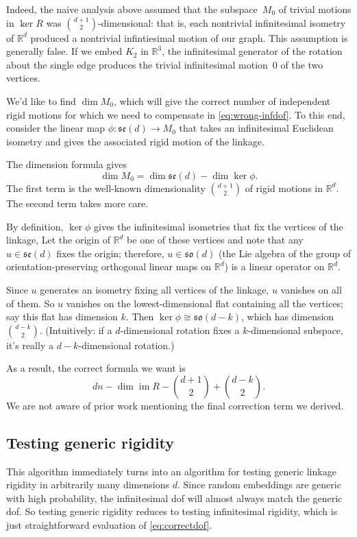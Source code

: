 \documentclass[aps,prd,final,twocolumn,letterpaper,nofootinbib]{revtex4-1}
\newcommand\RR{\mathbb{R}}
\DeclareMathOperator\im{im}
\begin{document}
Indeed, the naive analysis above
assumed that the subspace~$M_0$ of trivial motions in $\ker R$
was $\binom{d+1}{2}$-dimensional:
that is, each nontrivial infinitesimal isometry of $\RR^d$
produced a nontrivial infintiesimal motion of our graph.
This assumption is generally false.
If we embed $K_2$ in $\RR^3$,
the infinitesimal generator
of the rotation about the single edge
produces the trivial infinitesimal motion~0
of the two vertices.

We'd like to find $\dim M_0$,
which will give the correct number of independent rigid motions
for which we need to compensate in \cref{eq:wrong-infdof}.
To this end,
consider the linear map $\phi\colon\mathfrak{se}(d) \to M_0$
that takes an infinitesimal Euclidean isometry
and gives the associated rigid motion of the linkage.

The dimension formula gives
\[
    \dim M_0 = \dim\mathfrak{se}(d) - \dim\ker\phi.
\]
The first term is the well-known dimensionality $\binom{d+1}{2}$
of rigid motions in $\RR^d$.
The second term takes more care.

By definition, $\ker\phi$ gives the infinitesimal isometries
that fix the vertices of the linkage,
Let the origin of $\RR^d$ be one of these vertices
and note that any $u\in \mathfrak{se}(d)$ fixes the origin;
therefore, $u\in\mathfrak{so}(d)$
(the Lie algebra of the group
of orientation-preserving orthogonal linear maps on $\RR^d$)
is a linear operator on $\RR^d$.

Since $u$ generates an isometry fixing all vertices of the linkage,
$u$ vanishes on all of them.
So $u$ vanishes on the lowest-dimensional flat containing all the vertices;
say this flat has dimension $k$.
Then $\ker\phi\cong\mathfrak{so}(d-k)$, which has dimension $\binom{d-k}{2}$.
(Intuitively: if a $d$-dimensional rotation fixes a $k$-dimensional subspace,
it's really a $d-k$-dimensional rotation.)

As a result, the correct formula we want is
\begin{equation}\label{eq:correctdof}
    dn - \dim\im R - \binom{d+1}{2} + \binom{d-k}{2}.
\end{equation}
We are not aware of prior work mentioning the final correction term we derived.

\subsection{Testing generic rigidity}


This algorithm immediately turns into an algorithm
for testing generic linkage rigidity in arbitrarily many dimensions $d$.
Since random embeddings are generic with high probability,
the infinitesimal dof will almost always match the generic dof.
So testing generic rigidity reduces to testing infinitesimal rigidity,
which is just straightforward evaluation of \cref{eq:correctdof}.
\end{document}
